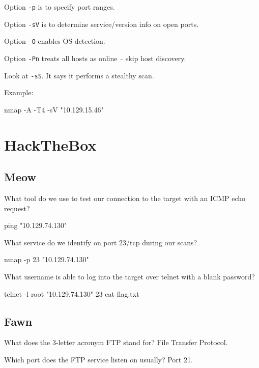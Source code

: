 \documentclass[a4paper,12pt]{article}
\newcommand{\bashinline}[1]{\texttt{#1}}
\begin{document}
\n

Option \bashinline{-p} is to specify port ranges.

\n

Option \bashinline{-sV} is to determine service/version info on open ports.

\n

Option \bashinline{-O} enables OS detection.

\n

Option \bashinline{-Pn} treats all hosts as online -- skip host discovery.

\n

Look at \bashinline{-sS}. It says it performs a stealthy scan.

Example:
\begin{bash}
nmap -A -T4 -sV "10.129.15.46"
\end{bash}

\pagebreak

\section{HackTheBox}

\subsection{Meow \faLinux}

What tool do we use to test our connection to the target with an ICMP echo request?
\begin{bash}
ping "10.129.74.130"
\end{bash}

What service do we identify on port 23/tcp during our scans?
\begin{bash}
nmap -p 23 "10.129.74.130"
\end{bash}

What username is able to log into the target over telnet with a blank password?
\begin{bash}
telnet -l root "10.129.74.130" 23
cat flag.txt
\end{bash}

\subsection{Fawn \faLinux}

What does the 3-letter acronym FTP stand for? File Transfer Protocol.

Which port does the FTP service listen on usually? Port 21.
\end{document}
